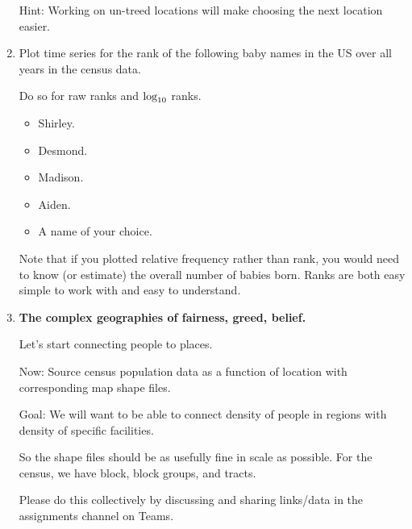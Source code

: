 \begin{enumerate}
  Hint: 
  Working on un-treed locations will
  make choosing the next location easier.  

  
   \solutionstart


   \solutionend


  

\item

  Plot time series for the rank
  of the following baby names in the US over all years in the census data.

  Do so for raw ranks and $\textnormal{log}_{10}$ ranks.

  \begin{itemize}
  \item 
    Shirley.
  \item
    Desmond.
  \item
    Madison.
  \item
    Aiden.
  \item
    A name of your choice.
  \end{itemize}

  Note that if you plotted relative frequency rather than rank,
  you would need to know (or estimate) the overall number of babies born.
  Ranks are both easy simple to work with and easy to understand.


  
   \solutionstart


   \solutionend

  
\item
  \textbf{The complex geographies of fairness, greed, belief.}

  Let's start connecting people to places.

  Now: Source census population data as a function of location
  with corresponding map shape files.

  Goal: We will want to be able to connect density of people in regions
  with density of specific facilities.

  So the shape files should be as usefully fine in scale as possible.
  For the census, we have block, block groups, and tracts.

  Please do this collectively by discussing and sharing links/data in the
  assignments channel on Teams.


\end{enumerate}
